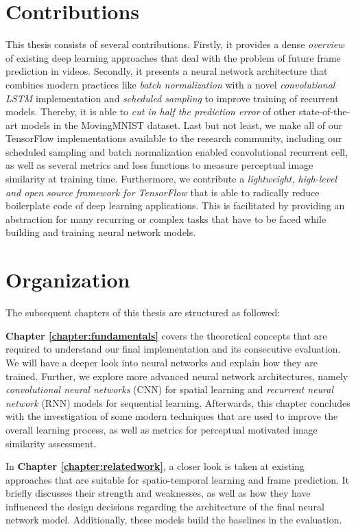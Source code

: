 \section{Contributions}

This thesis consists of several contributions. Firstly, it provides a dense \textit{overview} of existing deep learning approaches that deal with the problem of future frame prediction in videos. Secondly, it presents a neural network architecture that combines modern practices like \textit{batch normalization} with a novel \textit{convolutional LSTM} implementation and \textit{scheduled sampling} to improve training of recurrent models. Thereby, it is able to \textit{cut in half the prediction error} of other state-of-the-art models in the MovingMNIST dataset. Last but not least, we make all of our TensorFlow implementations available to the research community, including our scheduled sampling and batch normalization enabled convolutional recurrent cell, as well as several metrics and loss functions to measure perceptual image similarity at training time. Furthermore, we contribute a \textit{lightweight, high-level and open source framework for TensorFlow} that is able to radically reduce boilerplate code of deep learning applications. This is facilitated by providing an abstraction for many recurring or complex tasks that have to be faced while building and training neural network models.


\section{Organization}

The subsequent chapters of this thesis are structured as followed:

\textbf{Chapter \ref{chapter:fundamentals}} covers the theoretical concepts that are required to understand our final implementation and its consecutive evaluation. We will have a deeper look into neural networks and explain how they are trained. Further, we explore more advanced neural network architectures, namely \textit{convolutional neural networks} (CNN) for spatial learning and \textit{recurrent neural network} (RNN) models for sequential learning. Afterwards, this chapter concludes with the investigation of some modern techniques that are used to improve the overall learning process, as well as metrics for perceptual motivated image similarity assessment.

In \textbf{Chapter \ref{chapter:relatedwork}}, a closer look is taken at existing approaches that are suitable for spatio-temporal learning and frame prediction. It briefly discusses their strength and weaknesses, as well as how they have influenced the design decisions regarding the architecture of the final neural network model. Additionally, these models build the baselines in the evaluation.

